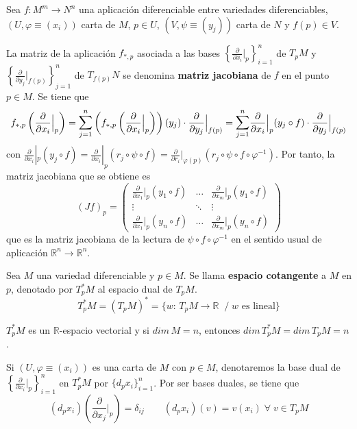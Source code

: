 Sea $f:M^m \to N^n$ una aplicación diferenciable entre variedades diferenciables, $(U,\varphi\equiv (x_i))$ carta de $M$, $p \in U$, $(V,\psi\equiv(y_j))$ carta de $N$ y $f(p) \in V$. 
\begin{defi}
La matriz de la aplicación $f_{*,p}$ asociada a las bases $\left\{\frac{\partial}{\partial x_i}|_p\right\}_{i=1}^n$ de $T_pM$ y $\left\{\frac{\partial}{\partial y_j}|_{f(p)}\right\}_{j=1}^n$ de $T_{f(p)}N$ se denomina \textbf{matriz jacobiana} de $f$ en el punto $p \in M$. Se tiene que
$$f_{*,p}\left(\frac{\partial}{\partial x_i}\Big|_p\right) = \mathlarger{\sum}_{j=1}^n \left(f_{*,p}\left(\frac{\partial}{\partial x_i}\Big|_p\right)\right) (y_j) \cdot \frac{\partial}{\partial y_j}\Big|_{f(p)} = \mathlarger{\sum}_{j=1}^n \frac{\partial}{\partial x_i}\Big|_p (y_j \circ f) \cdot \frac{\partial}{\partial y_j}\Big|_{f(p)}$$
con $\frac{\partial}{\partial x_i}|_p (y_j \circ f) = \frac{\partial}{\partial x_i}|_p (r_j \circ \psi \circ f) = \frac{\partial}{\partial r_i}|_{\varphi(p)} (r_j \circ \psi \circ f \circ \varphi^{-1})$. Por tanto, la matriz jacobiana que se obtiene es $$(Jf)_p =  \left(\begin{array}{ccc}
    \frac{\partial}{\partial x_1}{\Big|_p}(y_1 \circ f) & \dots &  \frac{\partial}{\partial x_m}{\Big|_p}(y_1 \circ f)\\
    \vdots & \ddots  & \vdots\\
    \frac{\partial}{\partial x_1}{\Big|_p}(y_n \circ f) & \dots & \frac{\partial}{\partial x_m}{\Big|_p}(y_n \circ f)
\end{array}\right)  $$
que es la matriz jacobiana de la lectura de $\psi \circ f \circ \varphi^{-1}$ en el sentido usual de aplicaci\'on $\mathbb R^n \longrightarrow \mathbb R^n$.
\end{defi}

\begin{defi}
Sea $M$ una variedad diferenciable y $p \in M$. Se llama \textbf{espacio cotangente} a $M$ en $p$, denotado por $T_p^*M$ al espacio dual de $T_pM$. $$T_p^*M = (T_pM)^* = \{w:\,T_pM\longrightarrow \mathbb{R} \;\; / \; w \text{ es lineal}\}$$
\end{defi}
\begin{obs}
$T_p^*M$ es un $\mathbb R$-espacio vectorial y si $dim\,M = n$, entonces $dim\,T_p^*M = dim\,T_pM = n$.
\end{obs}

\begin{ejem}
Si $(U,\varphi\equiv(x_i))$ es una carta de $M$ con $p\in M$, denotaremos la base dual de $\left\{\frac{\partial}{\partial x_i}|_p\right\}_{i=1}^n$ en $T_p^*M$ por $\{d_px_i\}_{i=1}^n$. Por ser bases duales, se tiene que $$(d_px_i)\left(\frac{\partial}{\partial x_j}\Big|_p\right) = \delta_{ij} \qquad (d_px_i)(v) = v(x_i) \;\forall\; v \in T_pM$$
\end{ejem}

